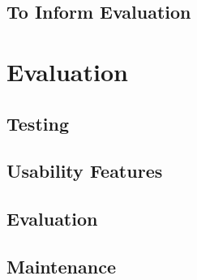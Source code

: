 ﻿\documentclass{article}
\begin{document}
    \subsection{To Inform Evaluation}
    
    
    \section{Evaluation}
    \subsection{Testing}
    \subsection{Usability Features}
    \subsection{Evaluation}
    \subsection{Maintenance}
\end{document}

